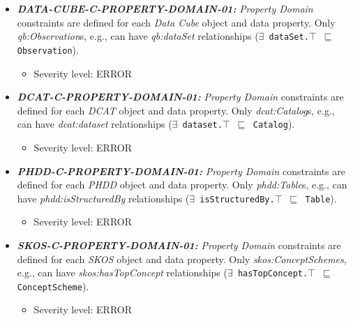 \documentclass{llncs}
\newcommand{\ms}[1]{\texttt{#1}}
\begin{document}
\begin{itemize}
	\item \textbf{{\em DATA-CUBE-C-PROPERTY-DOMAIN-01:}} 
	{\em Property Domain} constraints are defined for each \emph{Data Cube} object and data property.
  Only {\em qb:Observation}s, e.g., can have {\em qb:dataSet} relationships (\ms{$\exists$ dataSet.$\top$ $\sqsubseteq$ Observation}).
	\begin{itemize}
		\item Severity level: ERROR
	\end{itemize}
\end{itemize}

\begin{itemize}
	\item \textbf{{\em DCAT-C-PROPERTY-DOMAIN-01:}} 
	{\em Property Domain} constraints are defined for each \emph{DCAT} object and data property.
  Only {\em dcat:Catalog}s, e.g., can have {\em dcat:dataset} relationships (\ms{$\exists$ dataset.$\top$ $\sqsubseteq$ Catalog}).
	\begin{itemize}
		\item Severity level: ERROR
	\end{itemize}
\end{itemize}

\begin{itemize}
	\item \textbf{{\em PHDD-C-PROPERTY-DOMAIN-01:}} 
	{\em Property Domain} constraints are defined for each \emph{PHDD} object and data property.
  Only {\em phdd:Table}s, e.g., can have {\em phdd:isStructuredBy} relationships (\ms{$\exists$ isStructuredBy.$\top$ $\sqsubseteq$ Table}).
	\begin{itemize}
		\item Severity level: ERROR
	\end{itemize}
\end{itemize}

\begin{itemize}
	\item \textbf{{\em SKOS-C-PROPERTY-DOMAIN-01:}} 
	{\em Property Domain} constraints are defined for each \emph{SKOS} object and data property.
	Only {\em skos:ConceptSchemes}, e.g., can have {\em skos:hasTopConcept} relationships (\ms{$\exists$ hasTopConcept.$\top$ $\sqsubseteq$ ConceptScheme}).
	\begin{itemize}
		\item Severity level: ERROR
	\end{itemize}
\end{itemize}
\end{document}
